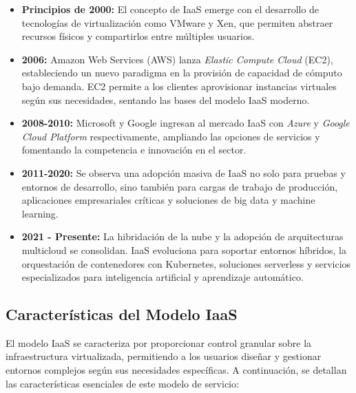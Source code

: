 {            \begin{itemize}
                \item \textbf{Principios de 2000:} El concepto de IaaS emerge con el desarrollo de tecnologías de virtualización como VMware y Xen, que permiten abstraer recursos físicos y compartirlos entre múltiples usuarios.
                \item \textbf{2006:} Amazon Web Services (AWS) lanza \textit{Elastic Compute Cloud} (EC2), estableciendo un nuevo paradigma en la provisión de capacidad de cómputo bajo demanda. EC2 permite a los clientes aprovisionar instancias virtuales según sus necesidades, sentando las bases del modelo IaaS moderno.
                \item \textbf{2008-2010:} Microsoft y Google ingresan al mercado IaaS con \textit{Azure} y \textit{Google Cloud Platform} respectivamente, ampliando las opciones de servicios y fomentando la competencia e innovación en el sector.
                \item \textbf{2011-2020:} Se observa una adopción masiva de IaaS no solo para pruebas y entornos de desarrollo, sino también para cargas de trabajo de producción, aplicaciones empresariales críticas y soluciones de big data y machine learning.
                \item \textbf{2021 - Presente:} La hibridación de la nube y la adopción de arquitecturas multicloud se consolidan. IaaS evoluciona para soportar entornos híbridos, la orquestación de contenedores con Kubernetes, soluciones serverless y servicios especializados para inteligencia artificial y aprendizaje automático.
            \end{itemize}
            
        \subsection{Características del Modelo IaaS}
            El modelo IaaS se caracteriza por proporcionar control granular sobre la infraestructura virtualizada, permitiendo a los usuarios diseñar y gestionar entornos complejos según sus necesidades específicas. A continuación, se detallan las características esenciales de este modelo de servicio:
            
}
